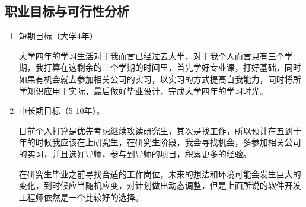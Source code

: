 \documentclass{article}
\begin{document}
\subsection{职业目标与可行性分析}
\par
\begin{enumerate}[(1)]
	\item 短期目标（大学4年）
	\par
	大学四年的学习生活对于我而言已经过去大半，对于我个人而言只有三个学期，我打算在这剩余的三个学期的时间里，首先学好专业课，打好基础，同时如果有机会就去参加相关公司的实习，以实习的方式提高自我能力，同时将所学知识应用于实际，最后做好毕业设计，完成大学四年的学习时光。
	\item 中长期目标（5-10年）。
	\par
	目前个人打算是优先考虑继续攻读研究生，其次是找工作，所以预计在五到十年的时候我应该在上研究生，在研究生阶段，我会寻找机会，多参加相关公司的实习，并且选好导师，参与到导师的项目，积累更多的经验。
	\par
	在研究生毕业之前寻找合适的工作岗位，未来的想法和环境可能会发生巨大的变化，到时候应当随机应变，对计划做出动态调整，但是上面所说的软件开发工程师依然是一个比较好的选择。
\end{enumerate}
\end{document}
